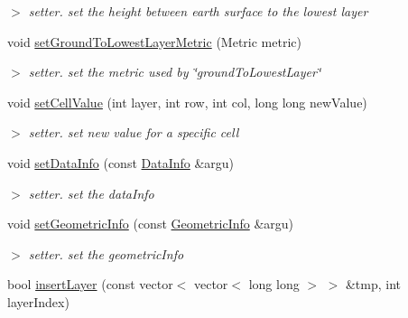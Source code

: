 \begin{DoxyCompactItemize}
\begin{DoxyCompactList}\small\item\em $>$ setter. set the height between earth surface to the lowest layer \end{DoxyCompactList}\item 
\hypertarget{classGridLayer_abce744494d0c6588242ae7bd9a1231fa}{void \hyperlink{classGridLayer_abce744494d0c6588242ae7bd9a1231fa}{set\-Ground\-To\-Lowest\-Layer\-Metric} (\-Metric metric)}\label{classGridLayer_abce744494d0c6588242ae7bd9a1231fa}

\begin{DoxyCompactList}\small\item\em $>$ setter. set the metric used by \char`\"{}ground\-To\-Lowest\-Layer\char`\"{} \end{DoxyCompactList}\item 
void \hyperlink{classGridLayer_a7dbf9877fce98d4dd9d29575643c2c2c}{set\-Cell\-Value} (int layer, int row, int col, long long new\-Value)
\begin{DoxyCompactList}\small\item\em $>$ setter. set new value for a specific cell \end{DoxyCompactList}\item 
\hypertarget{classGridLayer_a63145fba564be57678273e9bae1cacac}{void \hyperlink{classGridLayer_a63145fba564be57678273e9bae1cacac}{set\-Data\-Info} (const \hyperlink{structDataInfo}{\-Data\-Info} \&argu)}\label{classGridLayer_a63145fba564be57678273e9bae1cacac}

\begin{DoxyCompactList}\small\item\em $>$ setter. set the data\-Info \end{DoxyCompactList}\item 
\hypertarget{classGridLayer_a6e324a08ae12b96c8591149a28d82ff4}{void \hyperlink{classGridLayer_a6e324a08ae12b96c8591149a28d82ff4}{set\-Geometric\-Info} (const \hyperlink{structGeometricInfo}{\-Geometric\-Info} \&argu)}\label{classGridLayer_a6e324a08ae12b96c8591149a28d82ff4}

\begin{DoxyCompactList}\small\item\em $>$ setter. set the geometric\-Info \end{DoxyCompactList}\item 
\hypertarget{classGridLayer_a5d8428e905e0d016b4dd02b5ced48ecb}{bool \hyperlink{classGridLayer_a5d8428e905e0d016b4dd02b5ced48ecb}{insert\-Layer} (const vector$<$ vector$<$ long long $>$ $>$ \&tmp, int layer\-Index)}\label{classGridLayer_a5d8428e905e0d016b4dd02b5ced48ecb}


\end{DoxyCompactItemize}
